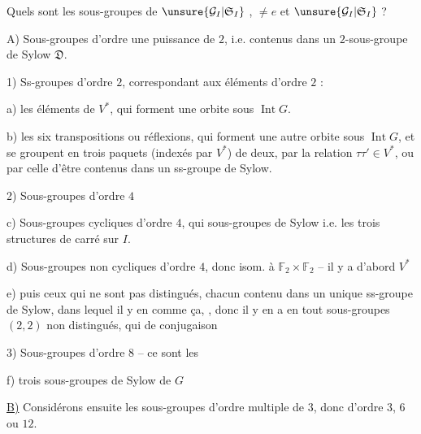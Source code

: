 Quels sont les sous-groupes de $\unsure{\mathcal{G}_I|\mathfrak{S}_I}$ , $\ne e$ et $\unsure{\mathcal{G}_I|\mathfrak{S}_I}$ ?

A) Sous-groupes d'ordre une puissance de $2$, i.e. contenus dans un $2$-sous-groupe de Sylow $\mathfrak{D}$.


1) Ss-groupes d'ordre $2$, correspondant aux éléments d'ordre $2$ :

a) les  éléments de $V^*$, qui forment une orbite sous $\operatorname{Int}G$.

b) les six transpositions ou réflexions, qui forment une autre orbite sous $\operatorname{Int}G$, et se groupent en trois paquets (indexés par $V^*$) de deux, par la relation $\tau\tau'\in V^*$, ou par celle d'être contenus dans un ss-groupe de Sylow.

2) Sous-groupes d'ordre $4$

c)  Sous-groupes cycliques d'ordre $4$, qui  sous-groupes de Sylow i.e. les trois structures de carré sur $I$.

d) Sous-groupes non cycliques d'ordre $4$, donc isom. à $\mathbb{F}_2\times\mathbb{F}_2$ -- il y a d'abord $V^*$

e) puis ceux qui ne sont pas distingués, chacun contenu dans un unique ss-groupe de Sylow, dans lequel il y en  comme ça, , donc il y en a en tout  sous-groupes  $(2,2)$ non distingués, qui   de conjugaison 

3) Sous-groupes d'ordre $8$ -- ce sont les

f) trois sous-groupes de Sylow de $G$

\uline{B)} Considérons ensuite les sous-groupes  d'ordre multiple de $3$, donc d'ordre $3$, $6$ ou $12$.


